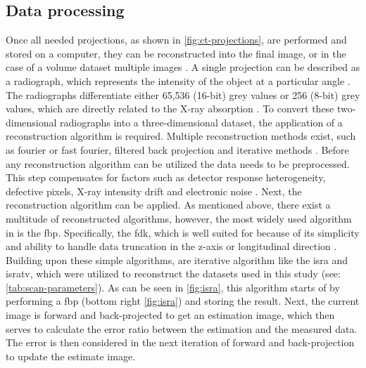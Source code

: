 \subsection{Data processing}\label{s:b-mct-processing}
Once all needed projections, as shown in \cref{fig:ct-projections}, are performed and stored on a computer, they can be reconstructed into the final image, or in the case of a volume dataset multiple images \cite{liMicrocomputedTomographySmall2008,orhanMicrocomputedTomographyMicroCT2020}.
A single projection can be described as a radiograph, which represents the intensity of the object at a particular angle \cite{liMicrocomputedTomographySmall2008,orhanMicrocomputedTomographyMicroCT2020}.
The radiographs differentiate either 65,536 (16-\gls{bit}) grey values or 256 (8-\gls{bit}) grey values, which are directly related to the X-ray absorption \cite{liMicrocomputedTomographySmall2008,orhanMicrocomputedTomographyMicroCT2020}.
To convert these two-dimensional radiographs into a three-dimensional dataset, the application of a reconstruction algorithm is required.
Multiple reconstruction methods exist, such as fourier or fast fourier, filtered back projection and iterative methods \cite{liMicrocomputedTomographySmall2008,orhanMicrocomputedTomographyMicroCT2020}.
Before any reconstruction algorithm can be utilized the data needs to be preprocessed.
This step compensates for factors such as detector response heterogeneity, defective pixels, X-ray intensity drift and electronic noise \cite{liMicrocomputedTomographySmall2008}.
Next, the reconstruction algorithm can be applied.
As mentioned above, there exist a multitude of reconstructed algorithms, however,
the most widely used algorithm in \mct\space is the \acrfull{fbp}.
Specifically, the \acrfull{fdk}, which is well suited for \mct\space because of its simplicity
and ability to handle data truncation in the z-axis or longitudinal direction \cite{liMicrocomputedTomographySmall2008,orhanMicrocomputedTomographyMicroCT2020}.
Building upon these simple algorithms, are iterative algorithm like the \gls{isra} and \gls{isratv},
which were utilized to reconstruct the datasets used in this study (see: \cref{tab:scan-parameters}).
As can be seen in \cref{fig:isra}, this algorithm starts of by performing a \acrshort{fbp} (bottom right \cref{fig:isra}) and storing the result.
Next, the current image is forward and back-projected to get an estimation image,
which then serves to calculate the error ratio between the estimation and the measured data.
The error is then considered in the next iteration of forward and back-projection to update the estimate image.
